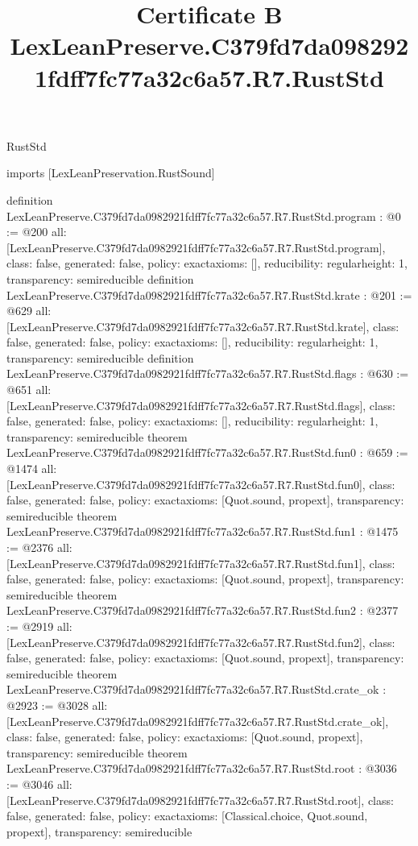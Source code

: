 \begin{lexlean}{RustStd}
\title{Certificate B LexLeanPreserve.C379fd7da0982921fdff7fc77a32c6a57.R7.RustStd}
\begin{coremodule}
imports [LexLeanPreservation.RustSound]

definition LexLeanPreserve.C379fd7da0982921fdff7fc77a32c6a57.R7.RustStd.program : @0 := @200 {
  all: [LexLeanPreserve.C379fd7da0982921fdff7fc77a32c6a57.R7.RustStd.program],
  class: false,
  generated: false,
  policy: exact{axioms: []},
  reducibility: regular{height: 1},
  transparency: semireducible
}
definition LexLeanPreserve.C379fd7da0982921fdff7fc77a32c6a57.R7.RustStd.krate : @201 := @629 {
  all: [LexLeanPreserve.C379fd7da0982921fdff7fc77a32c6a57.R7.RustStd.krate],
  class: false,
  generated: false,
  policy: exact{axioms: []},
  reducibility: regular{height: 1},
  transparency: semireducible
}
definition LexLeanPreserve.C379fd7da0982921fdff7fc77a32c6a57.R7.RustStd.flags : @630 := @651 {
  all: [LexLeanPreserve.C379fd7da0982921fdff7fc77a32c6a57.R7.RustStd.flags],
  class: false,
  generated: false,
  policy: exact{axioms: []},
  reducibility: regular{height: 1},
  transparency: semireducible
}
theorem LexLeanPreserve.C379fd7da0982921fdff7fc77a32c6a57.R7.RustStd.fun0 : @659 := @1474 {
  all: [LexLeanPreserve.C379fd7da0982921fdff7fc77a32c6a57.R7.RustStd.fun0],
  class: false,
  generated: false,
  policy: exact{axioms: [Quot.sound, propext]},
  transparency: semireducible
}
theorem LexLeanPreserve.C379fd7da0982921fdff7fc77a32c6a57.R7.RustStd.fun1 : @1475 := @2376 {
  all: [LexLeanPreserve.C379fd7da0982921fdff7fc77a32c6a57.R7.RustStd.fun1],
  class: false,
  generated: false,
  policy: exact{axioms: [Quot.sound, propext]},
  transparency: semireducible
}
theorem LexLeanPreserve.C379fd7da0982921fdff7fc77a32c6a57.R7.RustStd.fun2 : @2377 := @2919 {
  all: [LexLeanPreserve.C379fd7da0982921fdff7fc77a32c6a57.R7.RustStd.fun2],
  class: false,
  generated: false,
  policy: exact{axioms: [Quot.sound, propext]},
  transparency: semireducible
}
theorem LexLeanPreserve.C379fd7da0982921fdff7fc77a32c6a57.R7.RustStd.crate_ok : @2923 := @3028 {
  all: [LexLeanPreserve.C379fd7da0982921fdff7fc77a32c6a57.R7.RustStd.crate_ok],
  class: false,
  generated: false,
  policy: exact{axioms: [Quot.sound, propext]},
  transparency: semireducible
}
theorem LexLeanPreserve.C379fd7da0982921fdff7fc77a32c6a57.R7.RustStd.root : @3036 := @3046 {
  all: [LexLeanPreserve.C379fd7da0982921fdff7fc77a32c6a57.R7.RustStd.root],
  class: false,
  generated: false,
  policy: exact{axioms: [Classical.choice, Quot.sound, propext]},
  transparency: semireducible
}


\end{coremodule}
\end{lexlean}
